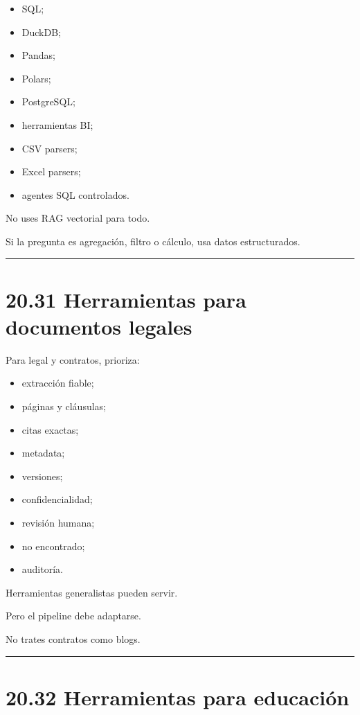 \begin{itemize}
\tightlist
\item
  SQL;
\item
  DuckDB;
\item
  Pandas;
\item
  Polars;
\item
  PostgreSQL;
\item
  herramientas BI;
\item
  CSV parsers;
\item
  Excel parsers;
\item
  agentes SQL controlados.
\end{itemize}

No uses RAG vectorial para todo.

Si la pregunta es agregación, filtro o cálculo, usa datos estructurados.

\begin{center}\rule{0.5\linewidth}{0.5pt}\end{center}

\section{20.31 Herramientas para documentos
legales}\label{herramientas-para-documentos-legales}

Para legal y contratos, prioriza:

\begin{itemize}
\tightlist
\item
  extracción fiable;
\item
  páginas y cláusulas;
\item
  citas exactas;
\item
  metadata;
\item
  versiones;
\item
  confidencialidad;
\item
  revisión humana;
\item
  no encontrado;
\item
  auditoría.
\end{itemize}

Herramientas generalistas pueden servir.

Pero el pipeline debe adaptarse.

No trates contratos como blogs.

\begin{center}\rule{0.5\linewidth}{0.5pt}\end{center}

\section{20.32 Herramientas para
educación}\label{herramientas-para-educaciuxf3n}

